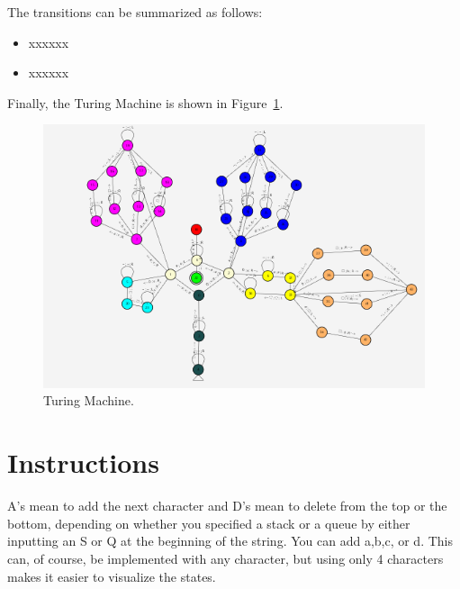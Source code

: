 \documentclass{article}
\begin{document}
The transitions can be summarized as follows:
\begin{itemize}
    \item xxxxxx
    \item xxxxxx
\end{itemize}

Finally, the Turing Machine is shown in Figure\ \ref{fig:stackqueue}.
\begin{figure}
    \includegraphics[width=\linewidth]{stackqueue.png}
    \caption{Turing Machine.}\label{fig:stackqueue}
\end{figure}

\section{Instructions}
A's mean to add the next character and D's mean to delete from the top or the bottom, depending on whether you specified a stack or a queue
by either inputting an S or Q at the beginning of the string. 
You can add a,b,c, or d. This can, of course, be implemented with any character,
but using only 4 characters makes it easier to visualize the states.
\end{document}
